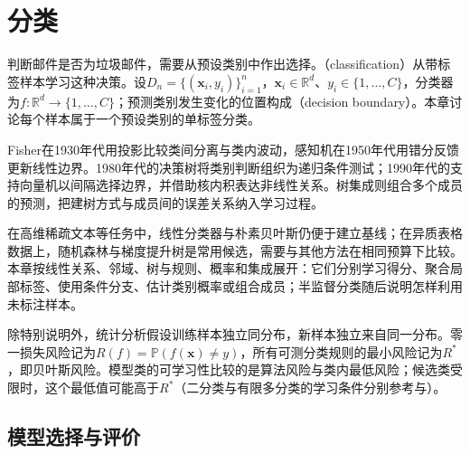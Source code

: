 \chapter{分类}
\label{chap:classification}

判断邮件是否为垃圾邮件，需要从预设类别中作出选择。（classification）从带标签样本学习这种决策。设$D_n=\{(\bm{x}_i,y_i)\}_{i=1}^{n}$，$\bm{x}_i\in\mathbb{R}^{d}$、$y_i\in\{1,\dots,C\}$，分类器为$f:\mathbb{R}^{d}\to\{1,\dots,C\}$；预测类别发生变化的位置构成（decision boundary）。本章讨论每个样本属于一个预设类别的单标签分类。

Fisher在1930年代用投影比较类间分离与类内波动，感知机在1950年代用错分反馈更新线性边界。1980年代的决策树将类别判断组织为递归条件测试；1990年代的支持向量机以间隔选择边界，并借助核内积表达非线性关系。树集成则组合多个成员的预测，把建树方式与成员间的误差关系纳入学习过程。

在高维稀疏文本等任务中，线性分类器与朴素贝叶斯仍便于建立基线；在异质表格数据上，随机森林与梯度提升树是常用候选，需要与其他方法在相同预算下比较。本章按线性关系、邻域、树与规则、概率和集成展开：它们分别学习得分、聚合局部标签、使用条件分支、估计类别概率或组合成员；半监督分类随后说明怎样利用未标注样本。

除特别说明外，统计分析假设训练样本独立同分布，新样本独立来自同一分布。零一损失风险记为$R(f)=\mathbb{P}(f(\bm{x})\ne y)$，所有可测分类规则的最小风险记为$R^\ast$，即贝叶斯风险。模型类的可学习性比较的是算法风险与类内最低风险；候选类受限时，这个最低值可能高于$R^\ast$（二分类与有限多分类的学习条件分别参考与）。









\section{模型选择与评价}
\label{sec:classification-evaluation}

